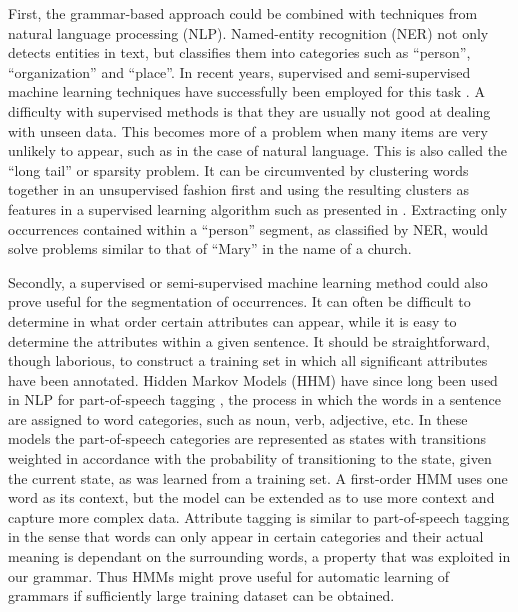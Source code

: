First, the grammar-based approach could be combined with techniques from natural language processing (NLP).
Named-entity recognition (NER) not only detects entities in text, but classifies them into categories such as ``person'', ``organization'' and ``place''.
In recent years, supervised and semi-supervised machine learning techniques have successfully been employed for this task \citep{Miller2004}.
A difficulty with supervised methods is that they are usually not good at dealing with unseen data.
This becomes more of a problem when many items are very unlikely to appear, such as in the case of natural language.
This is also called the ``long tail'' or sparsity problem.
It can be circumvented by clustering words together in an unsupervised fashion first and using the resulting clusters as features in a supervised learning algorithm such as presented in \citet{Miller2004}.
Extracting only occurrences contained within a ``person'' segment, as classified by NER, would solve problems similar to that of ``Mary'' in the name of a church.

Secondly, a supervised or semi-supervised machine learning method could also prove useful for the segmentation of occurrences.
It can often be difficult to determine in what order certain attributes can appear, while it is easy to determine the attributes within a given sentence.
It should be straightforward, though laborious, to construct a training set in which all significant attributes have been annotated.
Hidden Markov Models (HHM) have since long been used in NLP for part-of-speech tagging \citep{Kupiec1992}, the process in which the words in a sentence are assigned to word categories, such as noun, verb, adjective, etc.
In these models the part-of-speech categories are represented as states with transitions weighted in accordance with the probability of transitioning to the state, given the current state, as was learned from a training set.
A first-order HMM uses one word as its context, but the model can be extended as to use more context and capture more complex data.
Attribute tagging is similar to part-of-speech tagging in the sense that words can only appear in certain categories and their actual meaning is dependant on the surrounding words, a property that was exploited in our grammar.
Thus HMMs might prove useful for automatic learning of grammars if sufficiently large training dataset can be obtained.

